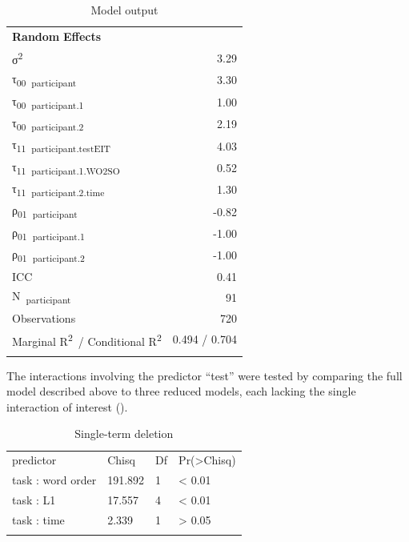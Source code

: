 \begin{table}
\begin{tabularx}{\textwidth}{lrrr}
    \multicolumn{4}{X}{\textbf{Random} \textbf{Effects}}\\
    σ\textsuperscript{2} & \multicolumn{3}{X}{3.29}\\
    τ\textsubscript{00}~\textsubscript{participant} & \multicolumn{3}{X}{3.30}\\
    τ\textsubscript{00}~\textsubscript{participant.1} & \multicolumn{3}{X}{1.00}\\
    τ\textsubscript{00}~\textsubscript{participant.2} & \multicolumn{3}{X}{2.19}\\
    τ\textsubscript{11}~\textsubscript{participant.testEIT} & \multicolumn{3}{X}{4.03}\\
    τ\textsubscript{11}~\textsubscript{participant.1.WO2SO} & \multicolumn{3}{X}{0.52}\\
    τ\textsubscript{11}~\textsubscript{participant.2.time} & \multicolumn{3}{X}{1.30}\\
    ρ\textsubscript{01}~\textsubscript{participant} & \multicolumn{3}{X}{{}-0.82}\\
    ρ\textsubscript{01}~\textsubscript{participant.1} & \multicolumn{3}{X}{{}-1.00}\\
    ρ\textsubscript{01}~\textsubscript{participant.2} & \multicolumn{3}{X}{{}-1.00}\\
    ICC & \multicolumn{3}{X}{0.41}\\
    N~\textsubscript{participant} & \multicolumn{3}{X}{91}\\
    Observations & \multicolumn{3}{X}{720}\\
    Marginal R\textsuperscript{2}~/ Conditional R\textsuperscript{2} & \multicolumn{3}{X}{0.494 / 0.704}\\
    \lspbottomrule
    \end{tabularx}
    \caption{Model output}
    \label{tab:06:7}
\end{table}

The interactions involving the predictor “test” were tested by comparing the full model described above to three reduced models, each lacking the single interaction of interest ().

\begin{table}
    \begin{tabularx}{\textwidth}{XXXX}
    \lsptoprule
    predictor & Chisq & Df & Pr(>Chisq)\\
    task : word order & 191.892 & 1 & < 0.01\\
    task : L1 & 17.557 & 4 & < 0.01\\
    task : time & 2.339 & 1 & > 0.05\\
    \lspbottomrule
    \end{tabularx}
    \caption{Single-term deletion}
    \label{tab:06:8}
\end{table}

